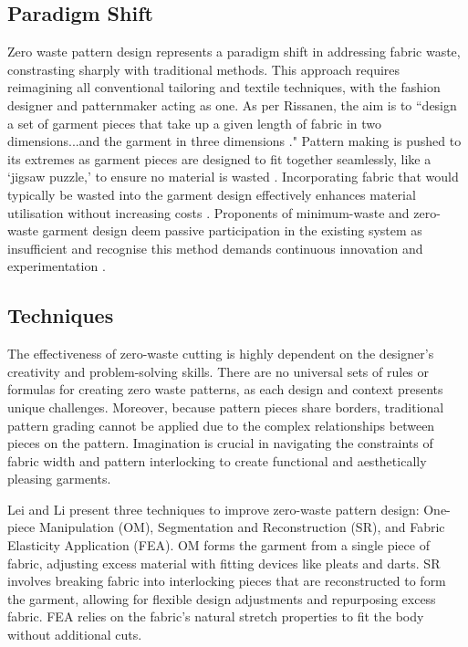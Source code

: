 \subsection{Paradigm Shift}
Zero waste pattern design represents a paradigm shift in addressing fabric waste, constrasting sharply with traditional methods. This approach requires reimagining all conventional tailoring and textile techniques, with the fashion designer and patternmaker acting as one. As per Rissanen, the aim is to ``design a set of garment pieces that take up a given length of fabric in two dimensions...and the garment in three dimensions \cite{fletcher_fashion_2012}." Pattern making is pushed to its extremes as garment pieces are designed to fit together seamlessly, like a `jigsaw puzzle,' to ensure no material is wasted \cite{fletcher_fashion_2012,fletcher_sustainable_2014,black_sustainable_2013,rissanen_zero-waste_2013,mcquillan_zero_2020}. Incorporating fabric that would typically be wasted into the garment design effectively enhances material utilisation without increasing costs \cite{fletcher_sustainable_2014}. Proponents of minimum-waste and zero-waste garment design deem passive participation in the existing system as insufficient and recognise this method demands continuous innovation and experimentation \cite{black_sustainable_2013}.

\subsection{Techniques}
The effectiveness of zero-waste cutting is highly dependent on the designer's creativity and problem-solving skills. There are no universal sets of rules or formulas for creating zero waste patterns, as each design and context presents unique challenges. Moreover, because pattern pieces share borders, traditional pattern grading cannot be applied due to the complex relationships between pieces on the pattern. Imagination is crucial in navigating the constraints of fabric width and pattern interlocking to create functional and aesthetically pleasing garments.

Lei and Li present three techniques to improve zero-waste pattern design: One-piece Manipulation (OM), Segmentation and Reconstruction (SR), and Fabric Elasticity Application (FEA). OM forms the garment from a single piece of fabric, adjusting excess material with fitting devices like pleats and darts. SR involves breaking fabric into interlocking pieces that are reconstructed to form the garment, allowing for flexible design adjustments and repurposing excess fabric. FEA relies on the fabric's natural stretch properties to fit the body without additional cuts.

